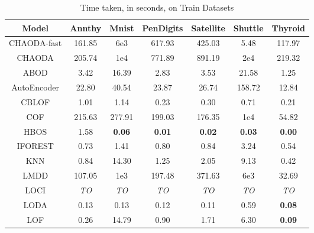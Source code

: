 \documentclass{article}
\begin{document}
\begin{table}[!t]
\renewcommand{\arraystretch}{1.25}
\caption{Time taken, in seconds, on Train Datasets}
\label{supplement:table:results:train-time}
\centering
\begin{tabular}{|c|c|c|c|c|c|c|}
\hline
\textbf{Model} & \textbf{Annthy} & \textbf{Mnist} & \textbf{PenDigits} & \textbf{Satellite} & \textbf{Shuttle} & \textbf{Thyroid} \\
\hline
CHAODA-fast &              161.85 &        6e3 &             617.93 &             425.03 &             5.48 &           117.97 \\
\hline
CHAODA &              205.74 &       1e4 &             771.89 &             891.19 &         2e4 &           219.32 \\
\hline
ABOD &                3.42 &          16.39 &               2.83 &               3.53 &            21.58 &             1.25 \\
\hline
AutoEncoder &               22.80 &          40.54 &              23.87 &              26.74 &           158.72 &            12.84 \\
\hline
CBLOF &                1.01 &           1.14 &               0.23 &               0.30 &             0.71 &             0.21 \\
\hline
COF &              215.63 &         277.91 &             199.03 &             176.35 &         1e4 &            54.82 \\
\hline
HBOS &                1.58 &  \textbf{0.06} &      \textbf{0.01} &      \textbf{0.02} &    \textbf{0.03} &    \textbf{0.00} \\
\hline
IFOREST &                0.73 &           1.41 &               0.80 &               0.84 &             3.24 &             0.54 \\
\hline
KNN &                0.84 &          14.30 &               1.25 &               2.05 &             9.13 &             0.42 \\
\hline
LMDD &              107.05 &        1e3 &             197.48 &             371.63 &          6e3 &            32.69 \\
\hline
LOCI &         \textit{TO} &    \textit{TO} &        \textit{TO} &        \textit{TO} &      \textit{TO} &      \textit{TO} \\
\hline
LODA &                0.13 &           0.13 &               0.12 &               0.11 &             0.59 &    \textbf{0.08} \\
\hline
LOF &                0.26 &          14.79 &               0.90 &               1.71 &             6.30 &    \textbf{0.09} \\

\end{tabular}
\end{table}
\end{document}
